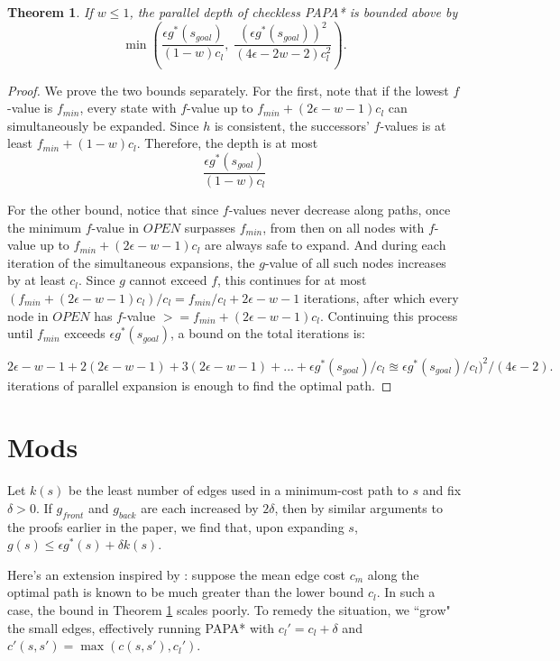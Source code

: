 \documentclass[letterpaper]{article}
\newtheorem{thm}{Theorem}
\begin{document}
\begin{thm}
\label{thm:depth}
If $w \le 1$, the parallel depth of checkless PAPA* is bounded above by
\[\min\left(\frac{\epsilon g^*(s_{goal})}{(1-w)c_l},\;
\frac{\left(\epsilon g^*(s_{goal})\right)^2 }{(4\epsilon-2w-2)c_l^2}\right).\]
\end{thm}

\begin{proof}
We prove the two bounds separately. For the first, note that if the lowest $f$-value is $f_{min}$, every state with $f$-value up to $f_{min} + (2\epsilon-w-1)c_l$ can simultaneously be expanded. Since $h$ is consistent, the successors' $f$-values is at least $f_{min} + (1-w)c_l$. Therefore, the depth is at most
\[\frac{\epsilon g^*(s_{goal})}{(1-w)c_l}\]

For the other bound, notice that since $f$-values never decrease along paths, once the minimum $f$-value in $OPEN$ surpasses $f_{min}$, from then on all nodes with $f$-value up to $f_{min} + (2\epsilon-w-1)c_l$ are always safe to expand. And during each iteration of the simultaneous expansions, the $g$-value of all such nodes increases by at least $c_l$. Since $g$ cannot exceed $f$, this continues for at most $(f_{min} + (2\epsilon-w-1)c_l) / c_l = f_{min}/c_l + 2\epsilon-w-1$ iterations, after which every node in $OPEN$ has $f$-value $>= f_{min} + (2\epsilon-w-1)c_l$. Continuing this process until $f_{min}$ exceeds $\epsilon g^*(s_{goal})$, a bound on the total iterations is:

$2\epsilon-w-1 + 2(2\epsilon-w-1) + 3(2\epsilon-w-1) + ... + \epsilon g^*(s_{goal})/c_l
\approxeq \epsilon g^*(s_{goal})/c_l )^2 / ( 4\epsilon-2 ).$
iterations of parallel expansion is enough to find the optimal path.
\end{proof}

\section{Mods}

Let $k(s)$ be the least number of edges used in a minimum-cost path to $s$ and fix $\delta > 0$. If $g_{front}$ and $g_{back}$ are each increased by $2\delta$, then by similar arguments to the proofs earlier in the paper, we find that, upon expanding $s$, $g(s) \le \epsilon g^*(s) + \delta k(s)$.

Here's an extension inspired by \cite{klein1997randomized}: suppose the mean edge cost $c_m$ along the optimal path is known to be much greater than the lower bound $c_l$. In such a case, the bound in Theorem \ref{thm:depth} scales poorly. To remedy the situation, we ``grow" the small edges, effectively running PAPA* with $c_l' = c_l + \delta$ and $c'(s,s') = \max(c(s,s'), c_l')$.
\end{document}
